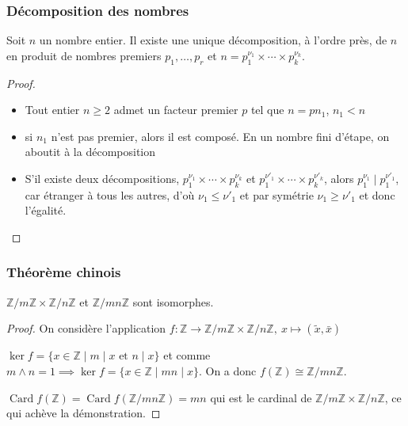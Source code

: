 \documentclass[french]{beamer}
\newcommand{\Z}{\mathbb{Z}}
\begin{document}
\begin{frame}
  \frametitle{Décomposition des nombres}
  \begin{theorem}[Décomposition]
    Soit $n$ un nombre entier. Il existe une unique décomposition, à
    l'ordre près, de $n$ en produit de nombres premiers $p_1,\dots,p_r$
    et $n = p_1^{\nu_1}\times\cdots\times p_k^{\nu_k}$.
  \end{theorem}
  \begin{proof}
    \begin{itemize}
      \item Tout entier $n\geq 2$ admet un facteur premier $p$ tel que
        $n=pn_1$, $n_1<n$
      \item si $n_1$ n'est pas premier, alors il est composé. En un
        nombre fini d'étape, on aboutit à la décomposition
      \item S'il existe deux décompositions, $p_1^{\nu_1}\times
        \cdots\times p_k^{\nu_k}$ et $p_1^{\nu'_1}\times \cdots\times
        p_k^{\nu'_k}$, alors $p_1^{\nu_1} \mid p_1^{\nu'_1}$, car
        étranger à tous les autres, d'où $\nu_1 \leq \nu'_1$ et par
        symétrie $\nu_1 \geq \nu'_1$ et donc l'égalité.
    \end{itemize}
  \end{proof}
\end{frame}

\begin{frame}
  \frametitle{Théorème chinois}

  \begin{theorem}
    $\Z/m\Z\times \Z/n\Z$ et $\Z/mn\Z$ sont isomorphes.
  \end{theorem}
  \begin{proof}
    On considère l'application $f:\Z\to\Z/m\Z\times\Z/n\Z,\ x\mapsto
    (\tilde{x},\bar{x})$

    $\ker f = \lbrace x\in \Z \mid m \mid x\text{ et } n \mid x \rbrace$
    et comme $m\wedge n = 1 \implies \ker f = \lbrace x\in \Z \mid mn
    \mid x \rbrace$. On a donc $f(\Z) \cong \Z/mn\Z$.

    $\mathop{Card}f(\Z) = \mathop{Card}f(\Z/mn\Z) = mn$ qui est le
    cardinal de $\Z/m\Z\times \Z/n\Z$, ce qui achève la démonstration.
  \end{proof}
\end{frame}
\end{document}
